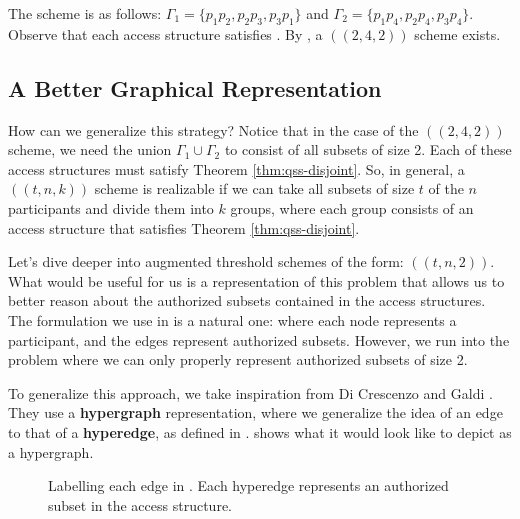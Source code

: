 The scheme is as follows: $\Gamma_1 = \{p_1p_2,p_2p_3,p_3p_1\}$ and $\Gamma_2 = \{p_1p_4,p_2p_4,p_3p_4\}$. Observe that each access structure satisfies . By , a $((2,4,2))$ scheme exists.

\subsection{A Better Graphical Representation}

How can we generalize this strategy? Notice that in the case of the $((2,4,2))$ scheme, we need the union $\Gamma_1 \cup \Gamma_2$ to consist of all subsets of size 2. Each of these access structures must satisfy Theorem \ref{thm:qss-disjoint}. So, in general, a $((t,n,k))$ scheme is realizable if we can take all subsets of size $t$ of the $n$ participants and divide them into $k$ groups, where each group consists of an access structure that satisfies Theorem \ref{thm:qss-disjoint}. 

Let's dive deeper into augmented threshold schemes of the form: $((t,n,2))$. What would be useful for us is a representation of this problem that allows us to better reason about the authorized subsets contained in the access structures. The formulation we use in  is a natural one: where each node represents a participant, and the edges represent authorized subsets. However, we run into the problem where we can only properly represent authorized subsets of size 2.

To generalize this approach, we take inspiration from Di Crescenzo and Galdi \cite{di_crescenzo_hypergraph_2009}. They use a \textbf{hypergraph} representation, where we generalize the idea of an edge to that of a \textbf{hyperedge}, as defined in .  shows what it would look like to depict  as a hypergraph.

\begin{figure}[ht]
    \centering
    \caption{Labelling each edge in . Each hyperedge represents an authorized subset in the access structure.}
    \label{fig:2-4-2-edge}
\end{figure}

